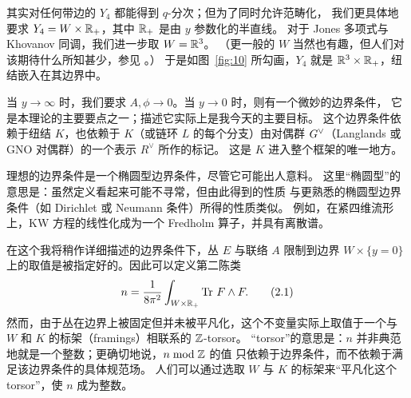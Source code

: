 其实对任何带边的 $Y_4$ 都能得到 $q$-分次；但为了同时允许范畴化，
我们更具体地要求 $Y_4=W\times\mathbb{R}_+$，其中 $\mathbb{R}_+$ 是由 $y$ 参数化的半直线。
对于 Jones 多项式与 Khovanov 同调，我们进一步取 $W=\mathbb{R}^3$。
（更一般的 $W$ 当然也有趣，但人们对该期待什么所知甚少，参见 \cite{GPV}。）
于是如图~\ref{fig:10} 所勾画，$Y_4$ 就是 $\mathbb{R}^3\times\mathbb{R}_+$，纽结嵌入在其边界中。



当 $y\to\infty$ 时，我们要求 $A,\phi\to 0$。当 $y\to 0$ 时，则有一个微妙的边界条件，
它是本理论的主要要点之一；描述它实际上是我今天的主要目标。
这个边界条件依赖于纽结 $K$，也依赖于 $K$（或链环 $L$ 的每个分支）由对偶群
$G^{\vee}$（Langlands 或 GNO 对偶群）的一个表示 $R^{\vee}$ 所作的标记。
这是 $K$ 进入整个框架的唯一地方。


理想的边界条件是一个椭圆型边界条件，尽管它可能出人意料。
这里“椭圆型”的意思是：虽然定义看起来可能不寻常，但由此得到的性质
与更熟悉的椭圆型边界条件（如 Dirichlet 或 Neumann 条件）所得的性质类似。
例如，在紧四维流形上，KW 方程的线性化成为一个 Fredholm 算子，并具有离散谱。

在这个我将稍作详细描述的边界条件下，丛 $E$ 与联络 $A$ 限制到边界
$W\times\{y=0\}$ 上的取值是被指定好的。因此可以定义第二陈类
\begin{equation}\stepcounter{equation}
  n=\frac{1}{8\pi^{2}}\int_{W\times\R_+}\Tr\,F\wedge F .
  \tag{2.1}\label{eq:2.1}
\end{equation}
然而，由于丛在边界上被固定但并未被平凡化，这个不变量实际上取值于一个与
$W$ 和 $K$ 的标架（framings）相联系的 $\mathbb{Z}$-torsor。
“torsor”的意思是：$n$ 并非典范地就是一个整数；更确切地说，$n\bmod\mathbb{Z}$ 的值
只依赖于边界条件，而不依赖于满足该边界条件的具体规范场。
人们可以通过选取 $W$ 与 $K$ 的标架来“平凡化这个 torsor”，使 $n$ 成为整数。

